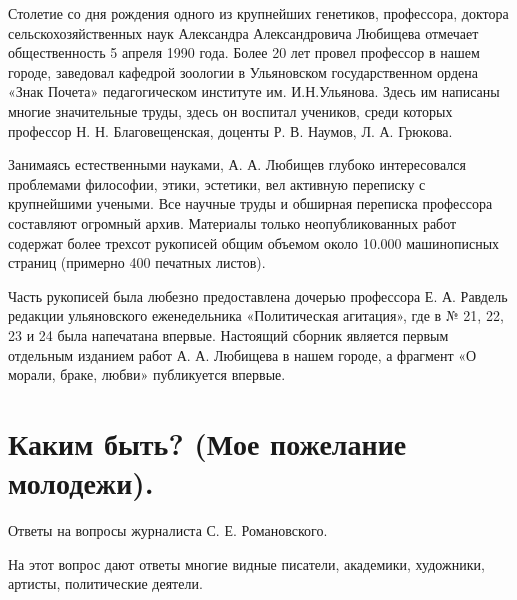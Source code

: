 
\tableofcontents{}

Столетие со  дня рождения одного из  крупнейших генетиков, профессора,
доктора сельскохозяйственных  наук Александра  Александровича Любищева
отмечает  общественность  5 апреля  1990  года.  Более 20  лет  провел
профессор в  нашем городе,  заведовал кафедрой зоологии  в Ульяновском
государственном  ордена  «Знак  Почета» педагогическом  институте  им.
И.Н.Ульянова. Здесь  им написаны  многие значительные труды,  здесь он
воспитал  учеников,  среди  которых профессор  Н.  Н.  Благовещенская,
доценты Р. В. Наумов, Л. А. Грюкова.

Занимаясь естественными науками, А. А. Любищев глубоко интересовался
проблемами философии, этики, эстетики, вел активную переписку с
крупнейшими учеными. Все научные труды и обширная переписка профессора
составляют огромный архив. Материалы только неопубликованных работ
содержат более трехсот рукописей общим объемом около 10.000
машинописных страниц (примерно 400 печатных листов).

Часть рукописей была любезно предоставлена дочерью профессора Е. А.
Равдель редакции ульяновского еженедельника «Политическая агитация»,
где в № 21, 22, 23 и 24 была напечатана впервые. Настоящий сборник
является первым отдельным изданием работ А. А. Любищева в нашем
городе, а фрагмент «О морали, браке, любви» публикуется впервые.


\section{Каким быть? (Мое пожелание молодежи).}


Ответы на вопросы журналиста С. Е. Романовского.

На этот вопрос дают ответы многие видные писатели, академики,
художники, артисты, политические деятели.

